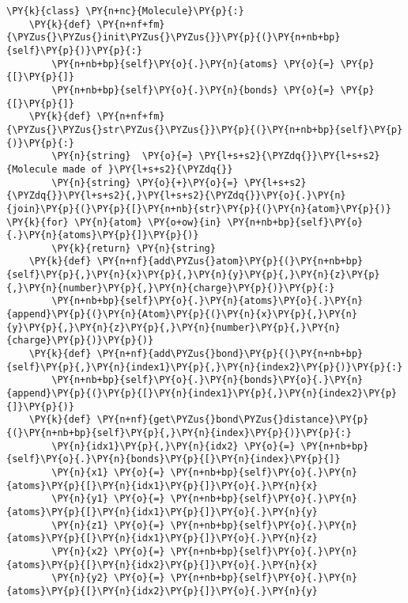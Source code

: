     \begin{tcolorbox}[breakable, size=fbox, boxrule=1pt, pad at break*=1mm,colback=cellbackground, colframe=cellborder]
\begin{Verbatim}[commandchars=\\\{\}]
\PY{k}{class} \PY{n+nc}{Molecule}\PY{p}{:}
    \PY{k}{def} \PY{n+nf+fm}{\PYZus{}\PYZus{}init\PYZus{}\PYZus{}}\PY{p}{(}\PY{n+nb+bp}{self}\PY{p}{)}\PY{p}{:}
        \PY{n+nb+bp}{self}\PY{o}{.}\PY{n}{atoms} \PY{o}{=} \PY{p}{[}\PY{p}{]}
        \PY{n+nb+bp}{self}\PY{o}{.}\PY{n}{bonds} \PY{o}{=} \PY{p}{[}\PY{p}{]}
    \PY{k}{def} \PY{n+nf+fm}{\PYZus{}\PYZus{}str\PYZus{}\PYZus{}}\PY{p}{(}\PY{n+nb+bp}{self}\PY{p}{)}\PY{p}{:}
        \PY{n}{string}  \PY{o}{=} \PY{l+s+s2}{\PYZdq{}}\PY{l+s+s2}{Molecule made of }\PY{l+s+s2}{\PYZdq{}}
        \PY{n}{string} \PY{o}{+}\PY{o}{=} \PY{l+s+s2}{\PYZdq{}}\PY{l+s+s2}{,}\PY{l+s+s2}{\PYZdq{}}\PY{o}{.}\PY{n}{join}\PY{p}{(}\PY{p}{[}\PY{n+nb}{str}\PY{p}{(}\PY{n}{atom}\PY{p}{)} \PY{k}{for} \PY{n}{atom} \PY{o+ow}{in} \PY{n+nb+bp}{self}\PY{o}{.}\PY{n}{atoms}\PY{p}{]}\PY{p}{)}
        \PY{k}{return} \PY{n}{string}
    \PY{k}{def} \PY{n+nf}{add\PYZus{}atom}\PY{p}{(}\PY{n+nb+bp}{self}\PY{p}{,}\PY{n}{x}\PY{p}{,}\PY{n}{y}\PY{p}{,}\PY{n}{z}\PY{p}{,}\PY{n}{number}\PY{p}{,}\PY{n}{charge}\PY{p}{)}\PY{p}{:}
        \PY{n+nb+bp}{self}\PY{o}{.}\PY{n}{atoms}\PY{o}{.}\PY{n}{append}\PY{p}{(}\PY{n}{Atom}\PY{p}{(}\PY{n}{x}\PY{p}{,}\PY{n}{y}\PY{p}{,}\PY{n}{z}\PY{p}{,}\PY{n}{number}\PY{p}{,}\PY{n}{charge}\PY{p}{)}\PY{p}{)}
    \PY{k}{def} \PY{n+nf}{add\PYZus{}bond}\PY{p}{(}\PY{n+nb+bp}{self}\PY{p}{,}\PY{n}{index1}\PY{p}{,}\PY{n}{index2}\PY{p}{)}\PY{p}{:}
        \PY{n+nb+bp}{self}\PY{o}{.}\PY{n}{bonds}\PY{o}{.}\PY{n}{append}\PY{p}{(}\PY{p}{[}\PY{n}{index1}\PY{p}{,}\PY{n}{index2}\PY{p}{]}\PY{p}{)}
    \PY{k}{def} \PY{n+nf}{get\PYZus{}bond\PYZus{}distance}\PY{p}{(}\PY{n+nb+bp}{self}\PY{p}{,}\PY{n}{index}\PY{p}{)}\PY{p}{:}
        \PY{n}{idx1}\PY{p}{,}\PY{n}{idx2} \PY{o}{=} \PY{n+nb+bp}{self}\PY{o}{.}\PY{n}{bonds}\PY{p}{[}\PY{n}{index}\PY{p}{]}
        \PY{n}{x1} \PY{o}{=} \PY{n+nb+bp}{self}\PY{o}{.}\PY{n}{atoms}\PY{p}{[}\PY{n}{idx1}\PY{p}{]}\PY{o}{.}\PY{n}{x}
        \PY{n}{y1} \PY{o}{=} \PY{n+nb+bp}{self}\PY{o}{.}\PY{n}{atoms}\PY{p}{[}\PY{n}{idx1}\PY{p}{]}\PY{o}{.}\PY{n}{y}
        \PY{n}{z1} \PY{o}{=} \PY{n+nb+bp}{self}\PY{o}{.}\PY{n}{atoms}\PY{p}{[}\PY{n}{idx1}\PY{p}{]}\PY{o}{.}\PY{n}{z}
        \PY{n}{x2} \PY{o}{=} \PY{n+nb+bp}{self}\PY{o}{.}\PY{n}{atoms}\PY{p}{[}\PY{n}{idx2}\PY{p}{]}\PY{o}{.}\PY{n}{x}
        \PY{n}{y2} \PY{o}{=} \PY{n+nb+bp}{self}\PY{o}{.}\PY{n}{atoms}\PY{p}{[}\PY{n}{idx2}\PY{p}{]}\PY{o}{.}\PY{n}{y}

\end{Verbatim}
\end{tcolorbox}
